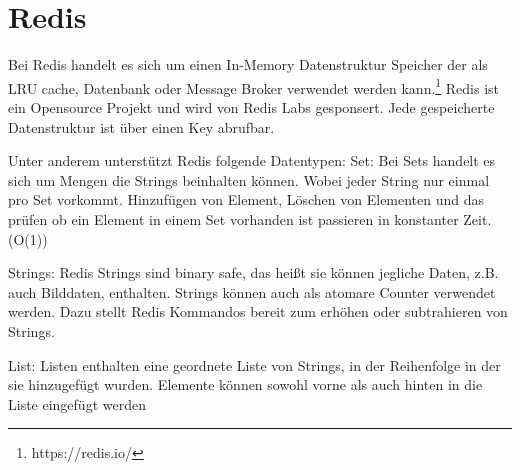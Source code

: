 \section{Redis}
Bei Redis handelt es sich um einen In-Memory Datenstruktur Speicher der als LRU cache, Datenbank oder Message Broker verwendet werden kann.\footnote{https://redis.io/} Redis ist ein Opensource Projekt und  wird von Redis Labs gesponsert. Jede gespeicherte Datenstruktur ist über einen Key abrufbar.

Unter anderem unterstützt Redis folgende Datentypen:
Set:
Bei Sets handelt es sich um Mengen die Strings beinhalten können. Wobei jeder String nur einmal pro Set vorkommt. Hinzufügen von Element, Löschen von Elementen und das prüfen ob ein Element in einem Set vorhanden ist passieren in konstanter Zeit. (O(1))

Strings:
Redis Strings sind binary safe, das heißt sie können jegliche Daten, z.B. auch Bilddaten, enthalten. Strings können auch als atomare Counter verwendet werden. Dazu stellt Redis Kommandos bereit zum erhöhen oder subtrahieren von Strings.

List:
Listen enthalten eine geordnete Liste von Strings, in der Reihenfolge in der sie hinzugefügt wurden. Elemente können sowohl vorne als auch hinten in die Liste eingefügt werden
